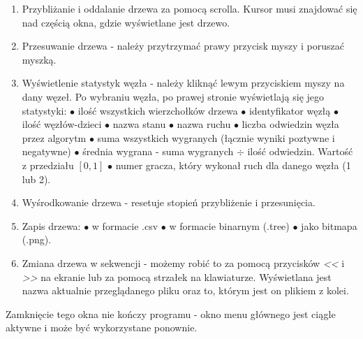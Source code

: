 \documentclass{article}
\begin{document}
\begin{enumerate}
	\item Przybliżanie i oddalanie drzewa za pomocą scrolla. Kursor musi znajdować się nad częścią okna, gdzie wyświetlane jest drzewo.\\
	\item Przesuwanie drzewa - należy przytrzymać prawy przycisk myszy i poruszać myszką.\\
	\item Wyświetlenie statystyk węzła - należy kliknąć lewym przyciskiem myszy na dany węzeł. Po wybraniu węzła, po prawej stronie wyświetlają się jego statystyki:
	\subitem $\bullet$ ilość wszystkich wierzchołków drzewa
	\subitem $\bullet$ identyfikator węzłą
	\subitem $\bullet$ ilość węzłów-dzieci
	\subitem $\bullet$ nazwa stanu
	\subitem $\bullet$ nazwa ruchu
	\subitem $\bullet$ liczba odwiedzin węzła przez algorytm
	\subitem $\bullet$ suma wszystkich wygranych (łącznie wyniki poztywne i negatywne)
	\subitem $\bullet$ średnia wygrana - suma wygranych $\div$ ilość odwiedzin. Wartość z przedziału $[0, 1]$
	\subitem $\bullet$ numer gracza, który wykonał ruch dla danego węzła (1 lub 2).\\
	\item Wyśrodkowanie drzewa - resetuje stopień przybliżenie i przesunięcia.\\
	\item Zapis drzewa:
	\subitem $\bullet$ w formacie .csv
	\subitem $\bullet$ w formacie binarnym (.tree)
	\subitem $\bullet$ jako bitmapa (.png).\\
	\item Zmiana drzewa w sekwencji - możemy robić to za pomocą przycisków \textit{<<} i \textit{>>} na ekranie lub za pomocą strzałek na klawiaturze. Wyświetlana jest nazwa aktualnie przeglądanego pliku oraz to, którym jest on plikiem z kolei.\\
\end{enumerate}
Zamknięcie tego okna nie kończy programu - okno menu głównego jest ciągle aktywne i może być wykorzystane ponownie.
\pagebreak
\end{document}
